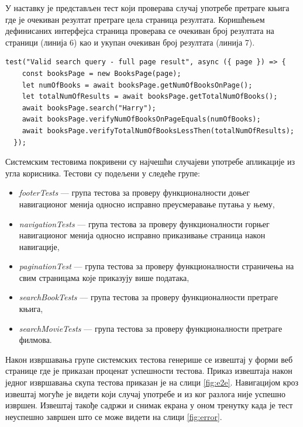 \documentclass[12pt,oneside]{memoir}
\begin{document}
У наставку је представљен тест који проверава случај употребе претраге књига где је очекиван резултат претраге цела страница резултата. Коришћењем дефинисаних интерфејса страница проверава се очекиван број резултата на страници (линија 6) као и укупан очекиван број резултата (линија 7).


\begin{lstlisting}[caption=Тест случаја употребе --- претрага књига, 
label={lst:pretragaKnjiga},
frame=single]
 test("Valid search query - full page result", async ({ page }) => {
    const booksPage = new BooksPage(page);
    let numOfBooks = await booksPage.getNumOfBooksOnPage();
    let totalNumOfResults = await booksPage.getTotalNumOfBooks();
    await booksPage.search("Harry");
    await booksPage.verifyNumOfBooksOnPageEquals(numOfBooks);
    await booksPage.verifyTotalNumOfBooksLessThen(totalNumOfResults);
  });
\end{lstlisting}

Системским тестовима покривени су најчешћи случајеви употребе апликације из угла корисника. Тестови су подељени у следеће групе: \newpage
\begin{itemize}
\item \textit{footerTests} --- група тестова за проверу функционалности доњег навигационог менија односно исправно преусмеравање путања у њему,
\item \textit{navigationTests} --- група тестова за проверу функционалности горњег навигационог менија односно исправно приказивање страница након навигације,
\item \textit{paginationTest} --- група тестова за проверу функционалности страничења на свим страницама које приказују више података,
\item \textit{searchBookTests} --- група тестова за проверу функционалности претраге књига,
\item \textit{searchMovieTests} --- група тестова за проверу функционалности претраге филмова.
\end{itemize}

Након извршавања групе системских тестова генерише се извештај у форми веб странице где је приказан проценат успешности тестова. Приказ извештаја након једног извршавања скупа тестова приказан је на слици \ref{fig:e2e}. Навигацијом кроз извештај могуће је видети који случај употребе и из ког разлога није успешно извршен. Извештај такође садржи и снимак екрана у оном тренутку када је тест неуспешно завршен што се може видети на слици \ref{fig:error}.
 
\end{document}
